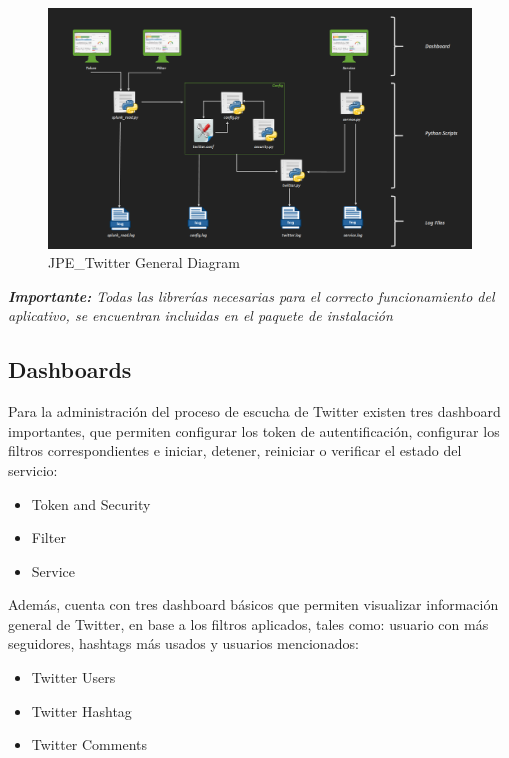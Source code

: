 \documentclass[report]{article}
\begin{document}
\begin{figure}[h!]
	\centering
	\includegraphics[scale=0.33]{img/arquitectura.PNG}
	\caption{\color{text}JPE\_Twitter General Diagram}
\end{figure}

\textit{\small \textbf{Importante:} Todas las librer\'ias necesarias para el correcto funcionamiento del aplicativo, se encuentran incluidas en el paquete de instalaci\'on}
\newpage
\subsection{Dashboards}

Para la administraci\'on del proceso de escucha de Twitter existen tres dashboard importantes, que permiten configurar los token de autentificaci\'on, configurar los filtros correspondientes e iniciar, detener, reiniciar o verificar el estado del servicio:
\newline
\begin{itemize}
\item Token and Security
\item Filter
\item Service
\newline
\end{itemize}

Además, cuenta con tres dashboard básicos que permiten visualizar información general de Twitter, en base a los filtros aplicados, tales como: usuario con más seguidores, hashtags más usados y usuarios mencionados: 
\newline
\begin{itemize}
\item Twitter Users
\item Twitter Hashtag
\item Twitter Comments
\newline
\end{itemize}
\end{document}
